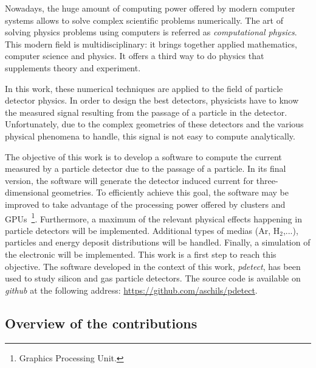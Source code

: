 \documentclass[11pt]{article}
\begin{document}
	Nowadays, the huge amount of computing power offered by modern computer systems allows
	to solve complex scientific problems numerically. The art of solving physics problems using
	computers is referred as \textit{computational physics}. This modern field
	is multidisciplinary: it brings together applied mathematics,
	computer science and physics. It offers a third way to do physics
	that supplements theory and experiment.

	In this work, these numerical techniques are applied to the field of particle
	detector physics. In order to design the best detectors,
	physicists have to know the measured signal resulting from the passage of a particle
	in the detector. Unfortunately, due to the complex geometries of these detectors
	and the various physical phenomena to handle, this signal is not easy
	to compute analytically.

	The objective of this work is to develop a software to compute the current measured
	by a particle detector due to the passage of a particle. In its final version,
	the software will generate the detector induced current for three-dimensional
	geometries. To efficiently achieve this goal, the software may be improved
	to take advantage of the processing power offered by clusters and GPUs~\footnote{Graphics Processing Unit.}.
	Furthermore, a maximum of the relevant physical effects happening
	in particle detectors will be implemented.
	Additional types of medias (Ar, H$_2$,...), particles and energy deposit
	distributions will be handled. Finally, a simulation of the electronic will
	be implemented. This work is a first step to reach this objective.
	The software developed in the context of this work, \textit{pdetect},
	has been used to study silicon and gas particle detectors. The source code
	is available on \textit{github} at the following address:
	\url{https://github.com/aschils/pdetect}.


	\subsection*{Overview of the contributions}
\end{document}
